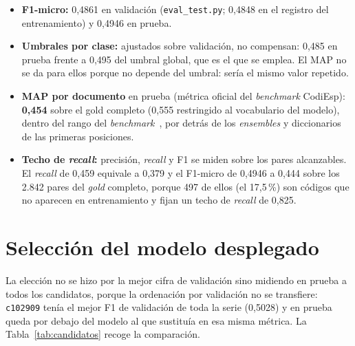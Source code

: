 \begin{itemize}
 \item \textbf{F1-micro:} 0{,}4861 en validación (\texttt{eval\_test.py}; 0,4848 en el registro del entrenamiento) y 0{,}4946 en prueba.
 \item \textbf{Umbrales por clase:} ajustados sobre validación, no compensan: 0,485 en prueba frente a 0,495 del umbral global, que es el que se emplea. El MAP no se da para ellos porque no depende del umbral: sería el mismo valor repetido.
 \item \textbf{MAP por documento} en prueba (métrica oficial del \emph{benchmark} CodiEsp): \textbf{0{,}454} sobre el gold completo (0{,}555 restringido al vocabulario del modelo), dentro del rango del \emph{benchmark}~\cite{miranda2020}, por detrás de los \emph{ensembles} y diccionarios de las primeras posiciones.
 \item \textbf{Techo de \emph{recall}:} precisión, \emph{recall} y F1 se miden sobre los pares alcanzables. El \emph{recall} de 0,459 equivale a 0,379 y el F1-micro de 0,4946 a 0,444 sobre los 2.842 pares del \emph{gold} completo, porque 497 de ellos (el 17,5\,\%) son códigos que no aparecen en entrenamiento y fijan un techo de \emph{recall} de 0,825.
\end{itemize}

\Needspace{0.35\textheight}
\section{Selección del modelo desplegado}
\label{sec:anexoH-candidatos}

La elección no se hizo por la mejor cifra de validación sino midiendo en prueba a todos los candidatos, porque la ordenación por validación no se transfiere: \texttt{c102909} tenía el mejor F1 de validación de toda la serie (0,5028) y en prueba queda por debajo del modelo al que sustituía en esa misma métrica. La Tabla~\ref{tab:candidatos} recoge la comparación.

